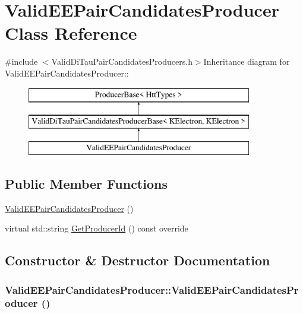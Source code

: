 \hypertarget{classValidEEPairCandidatesProducer}{
\section{ValidEEPairCandidatesProducer Class Reference}
\label{classValidEEPairCandidatesProducer}
}


{\ttfamily \#include $<$ValidDiTauPairCandidatesProducers.h$>$}Inheritance diagram for ValidEEPairCandidatesProducer::\begin{figure}[H]
\begin{center}
\leavevmode
\includegraphics[height=3cm]{classValidEEPairCandidatesProducer}
\end{center}
\end{figure}
\subsection*{Public Member Functions}
\begin{DoxyCompactItemize}
\item 
\hyperlink{classValidEEPairCandidatesProducer_ac24373f9187cea643c6eb88c4621b86f}{ValidEEPairCandidatesProducer} ()
\item 
virtual std::string \hyperlink{classValidEEPairCandidatesProducer_a0d6dc5d1ed1642937ae8125603856c8d}{GetProducerId} () const override
\end{DoxyCompactItemize}


\subsection{Constructor \& Destructor Documentation}
\hypertarget{classValidEEPairCandidatesProducer_ac24373f9187cea643c6eb88c4621b86f}{
\subsubsection[{ValidEEPairCandidatesProducer}]{\setlength{\rightskip}{0pt plus 5cm}ValidEEPairCandidatesProducer::ValidEEPairCandidatesProducer ()}}
\label{classValidEEPairCandidatesProducer_ac24373f9187cea643c6eb88c4621b86f}


